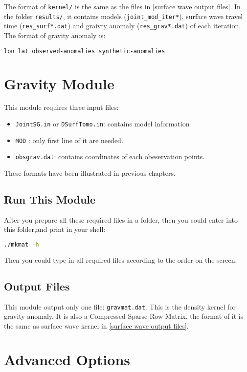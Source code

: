 \documentclass[UTF8]{article}
\begin{document}
The format of \verb!kernel/! is the same as the files
in \ref{surface wave output files}. In the folder \verb!results/!,
it contains models (\verb!joint_mod_iter*!), 
surface wave travel time (\verb!res_surf*.dat!) and 
graivty anomaly (\verb!res_grav*.dat!) 
of each iteration. The format of gravity anomaly is:
\begin{center}
    \texttt{lon lat observed-anomalies synthetic-anomalies}
\end{center}

\section{Gravity Module}
This module requires three input files:
\begin{itemize}
    \item \verb!JointSG.in! or \verb!DSurfTomo.in!: contains model information
    \item \texttt{MOD} : only first line of it are needed.
    \item \texttt{obsgrav.dat}: contains coordinates of each 
                     obeservation points.
\end{itemize}
These formats have been illustrated in previous chapters.

\subsection{Run This Module}
After you prepare all these required files in a folder,
then you could enter into this folder,and print in your shell:
\begin{lstlisting}[language=bash]
./mkmat -h
\end{lstlisting}
Then you could type in all required files according to 
the order on the screen.

\subsection{Output Files}\label{Gravity Matrix}
This module output only one file: \verb!gravmat.dat!. 
This is the density kernel for gravity anomaly. It is also
a Compressed Sparse Row Matrix, the format of it is the same
as surface wave kernel in \ref{surface wave output files}.

\section{Advanced Options}
\end{document}
